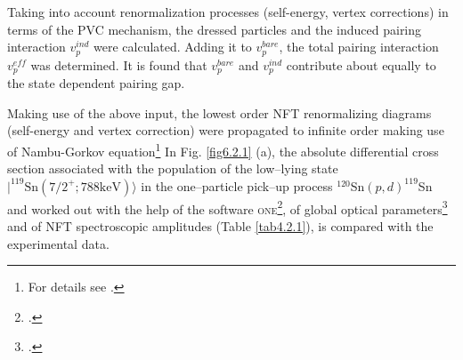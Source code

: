   Taking into account renormalization processes (self-energy, vertex corrections) in terms of the PVC mechanism, the dressed particles and the induced pairing interaction $v_{p}^{ind}$ were calculated. Adding it to $v^{bare}_p$, the total pairing interaction $v_p^{eff}$ was determined. It is found that $v_p^{bare}$ and $v_p^{ind}$ contribute about equally to the state dependent pairing gap.
  
  Making use of the above input, the lowest order NFT renormalizing diagrams (self-energy and vertex correction) were propagated to infinite order making use of Nambu-Gorkov equation\footnote{For details see \cite{Idini:15}.}
  In Fig. \ref{fig6.2.1} (a), the absolute differential cross section associated with the population of the low--lying state $|^{119}\text{Sn}(7/2^+;788 \text{keV})\rangle$ in the one--particle pick--up process $^{120}$Sn$(p,d)^{119}$Sn and  worked out with the help of the software \textsc{one}\footnote{\cite{Potel:12b}.}, of global optical parameters\footnote{\cite{Dickey:82}.} and of NFT spectroscopic amplitudes (Table \ref{tab4.2.1}), is compared with the experimental data.     
  
